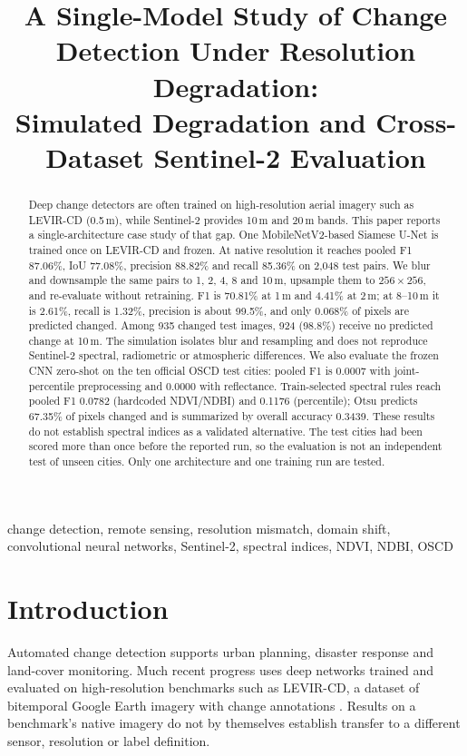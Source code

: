\documentclass[conference]{IEEEtran}
\title{A Single-Model Study of Change Detection Under Resolution Degradation:\\
Simulated Degradation and Cross-Dataset Sentinel-2 Evaluation}
\author{\IEEEauthorblockN{Aravind}
\IEEEauthorblockA{Department of Computer Science and Engineering\\
Presidency University\\
Bengaluru, India}}
\begin{document}
\maketitle

\begin{abstract}
Deep change detectors are often trained on high-resolution aerial imagery such
as LEVIR-CD (0.5\,m), while Sentinel-2 provides 10\,m and 20\,m bands. This
paper reports a single-architecture case study of that gap. One MobileNetV2-based
Siamese U-Net is trained once on LEVIR-CD and frozen. At native resolution it
reaches pooled F1 87.06\%, IoU 77.08\%, precision 88.82\% and recall 85.36\% on
2,048 test pairs. We blur and downsample the same pairs to 1, 2, 4, 8 and 10\,m,
upsample them to $256\times256$, and re-evaluate without retraining. F1 is
70.81\% at 1\,m and 4.41\% at 2\,m; at 8--10\,m it is 2.61\%, recall is 1.32\%,
precision is about 99.5\%, and only 0.068\% of pixels are predicted changed.
Among 935 changed test images, 924 (98.8\%) receive no predicted change at
10\,m. The simulation isolates blur and resampling and does not reproduce
Sentinel-2 spectral, radiometric or atmospheric differences. We also evaluate
the frozen CNN zero-shot on the ten official OSCD test cities: pooled F1 is
0.0007 with joint-percentile preprocessing and 0.0000 with reflectance.
Train-selected spectral rules reach pooled F1 0.0782 (hardcoded NDVI/NDBI) and
0.1176 (percentile); Otsu predicts 67.35\% of pixels changed and is summarized
by overall accuracy 0.3439. These results do not establish spectral indices as
a validated alternative. The test cities had been scored more than once before
the reported run, so the evaluation is not an independent test of unseen
cities. Only one architecture and one training run are tested.
\end{abstract}

\begin{IEEEkeywords}
change detection, remote sensing, resolution mismatch, domain shift,
convolutional neural networks, Sentinel-2, spectral indices, NDVI, NDBI, OSCD
\end{IEEEkeywords}

\section{Introduction}
Automated change detection supports urban planning, disaster response and
land-cover monitoring. Much recent progress uses deep networks trained and
evaluated on high-resolution benchmarks such as LEVIR-CD, a dataset of
bitemporal Google Earth imagery with change annotations
\cite{chen2020stanet}. Results on a benchmark's native imagery do not by
themselves establish transfer to a different sensor, resolution or label
definition.
\end{document}
